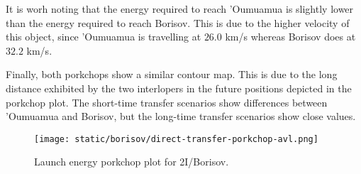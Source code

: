 It is worh noting that the energy required to reach 'Oumuamua is slightly lower
than the energy required to reach Borisov. This is due to the higher velocity of
this object, since 'Oumuamua is travelling at $26.0$ km/s whereas Borisov does
at $32.2$ km/s.

Finally, both porkchops show a similar contour map. This is due to the long
distance exhibited by the two interlopers in the future positions depicted in
the porkchop plot. The short-time transfer scenarios show differences between
'Oumuamua and Borisov, but the long-time transfer scenarios show close values.

\begin{figure}[H]
  \centering
  \texttt{[image: static/borisov/direct-transfer-porkchop-avl.png]}
  \caption{Launch energy porkchop plot for 2I/Borisov.}
  \label{fig:oumuamua-direct-transfer-porkchop}
  \label{fig:borisov-direct-transfer-porkchop-avl}
\end{figure}


